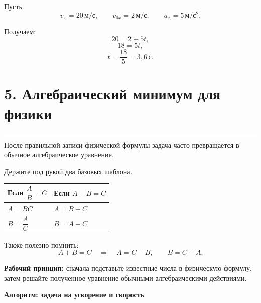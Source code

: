 \documentclass[a4paper,12pt]{article}
\newcommand{\sectionline}{%
  \par\vspace{-0.5em}%
  \noindent\textcolor{accent}{\rule{\linewidth}{0.7pt}}%
  \par\vspace{0.5em}%
}
\newcommand{\key}[1]{\textcolor{darkaccent}{\textbf{#1}}}
\begin{document}
Пусть
\[
  v_x=20\,\text{м}/\text{с},
  \qquad
  v_{0x}=2\,\text{м}/\text{с},
  \qquad
  a_x=5\,\text{м}/\text{с}^2.
\]

Получаем:
\[
  20=2+5t,
\]
\[
  18=5t,
\]
\[
  t=\frac{18}{5}=3{,}6\,\text{с}.
\]


\section*{5. Алгебраический минимум для физики}
\sectionline

После правильной записи физической формулы задача часто превращается в обычное алгебраическое уравнение.

Держите под рукой два базовых шаблона.

\begin{center}
\begin{tabularx}{0.9\linewidth}{@{}X X@{}}
\toprule
Если \(\dfrac{A}{B}=C\) & Если \(A-B=C\) \\
\midrule
\(A=BC\) & \(A=B+C\) \\
\(B=\dfrac{A}{C}\) & \(B=A-C\) \\
\bottomrule
\end{tabularx}
\end{center}

Также полезно помнить:
\[
  A+B=C
  \quad\Rightarrow\quad
  A=C-B,
  \qquad
  B=C-A.
\]

\key{Рабочий принцип:}
сначала подставьте известные числа в физическую формулу, затем решайте полученное уравнение обычными алгебраическими действиями.


\clearpage
\thispagestyle{empty}

\begin{center}
{\Large\textcolor{darkaccent}{\textbf{Алгоритм: задача на ускорение и скорость}}}
\end{center}

\vspace{4mm}
\end{document}
